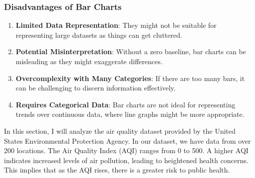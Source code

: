 \documentclass{article}\usepackage[]{graphicx}\usepackage[]{xcolor}
\begin{document}
\subsubsection{Disadvantages of Bar Charts}
\begin{enumerate}
    \item \textbf{Limited Data Representation}: They might not be suitable for representing large datasets as things can get cluttered.
    \item \textbf{Potential Misinterpretation}: Without a zero baseline, bar charts can be misleading as they might exaggerate differences.
    \item \textbf{Overcomplexity with Many Categories}: If there are too many bars, it can be challenging to discern information effectively.
    \item \textbf{Requires Categorical Data}: Bar charts are not ideal for representing trends over continuous data, where line graphs might be more appropriate.
\end{enumerate}

In this section, I will analyze the air quality dataset provided by the United States Environmental Protection Agency. In our dataset, we have data from over 200 locations. The Air Quality Index (AQI) ranges from 0 to 500. A higher AQI indicates increased levels of air pollution, leading to heightened health concerns. This implies that as the AQI rises, there is a greater risk to public health.
\end{document}
